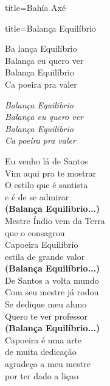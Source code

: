 \documentclass[fontsize=14pt, paper=a4, twoside, DIV=20]{scrreprt} %
\begin{document}
\begin{multicols*}{2}
\begin{song}{title={Bahía Axé}}
\begin{verse*}
    \end{verse*}
\end{song}


\begin{song}{title={Balança Equilíbrio}}
    \begin{verse*}
        Ba lança Equilíbrio\\
        Balança eu quero ver\\
        Balança Equilíbrio\\
        Ca poeira pra valer\\

        \begin{chorus*}
        \textit{Balança Equilibrio}\\
        \textit{Balança eu quero ver}\\
        \textit{Balança Equilibrio}\\
        \textit{Ca} \textit{poeira pra valer}\\
        \end{chorus*}

        Eu venho lá de Santos\\
        Vim aqui pra te mostrar\\
        O estilo que é santista\\
        e é de se admirar\\
        \textbf{(Balança Equilibrio...)}\\

        Mestre Índio vem da Terra\\
        que o consagrou\\
        Capoeira Equilíbrio\\
        estila de grande valor\\
        \textbf{(Balança Equilíbrio...)}\\

        De Santos a volta mundo\\
        Com seu mestre já rodou\\
        Se dedique meu aluno\\
        Quero te ver professor\\
        \textbf{(Balança Equilíbrio...)}\\

        Capoeira é uma arte\\
        de muita dedicação\\
        agradeço a meu mestre\\
        por ter dado a liçao\\
    \end{verse*}
\end{song}


\end{multicols*}
\end{document}
